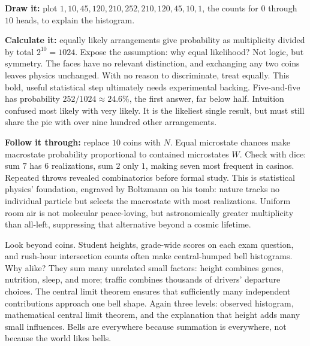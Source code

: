 \textbf{Draw it:} plot \(1,10,45,120,210,252,210,120,45,10,1\), the counts for \(0\) through \(10\) heads, to explain the histogram.

\begin{center}
\end{center}

\textbf{Calculate it:} equally likely arrangements give probability as multiplicity divided by total \(2^{10}=1024\). Expose the assumption: why equal likelihood? Not logic, but symmetry. The faces have no relevant distinction, and exchanging any two coins leaves physics unchanged. With no reason to discriminate, treat equally. This bold, useful statistical step ultimately needs experimental backing. Five-and-five has probability \(252/1024\approx 24.6\%\), the first answer, far below half. Intuition confused most likely with very likely. It is the likeliest single result, but must still share the pie with over nine hundred other arrangements.

\textbf{Follow it through:} replace \(10\) coins with \(N\). Equal microstate chances make macrostate probability proportional to contained microstates \(W\). Check with dice: sum \(7\) has \(6\) realizations, sum \(2\) only \(1\), making seven most frequent in casinos. Repeated throws revealed combinatorics before formal study. This is statistical physics' foundation, engraved by Boltzmann on his tomb: nature tracks no individual particle but selects the macrostate with most realizations. Uniform room air is not molecular peace-loving, but astronomically greater multiplicity than all-left, suppressing that alternative beyond a cosmic lifetime.

Look beyond coins. Student heights, grade-wide scores on each exam question, and rush-hour intersection counts often make central-humped bell histograms. Why alike? They sum many unrelated small factors: height combines genes, nutrition, sleep, and more; traffic combines thousands of drivers' departure choices. The central limit theorem ensures that sufficiently many independent contributions approach one bell shape. Again three levels: observed histogram, mathematical central limit theorem, and the explanation that height adds many small influences. Bells are everywhere because summation is everywhere, not because the world likes bells.

